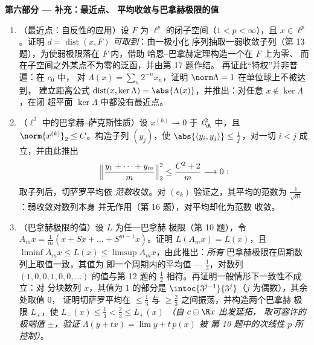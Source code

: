 \begin{problem}[{周末问题 --- $(\ell^p)' = \ell^q$，
自反性，以及 $\ell^\infty$ 的奇异性}]
\medskip
\noindent\textbf{第六部分 --- 补充：最近点、
平均收敛与巴拿赫极限的值}
\begin{enumerate}[resume]
  \item （最近点：自反性的应用）设 $F$ 为
        $\ell^p$ 的闭子空间（$1 < p < \infty$），且
        $x \in \ell^p$。证明 $d = \operatorname{dist}(x,
        F)$ \emph{可取到}：由一极小化
        序列抽取一弱收敛子列（第
        13 题），为使弱极限落在 $F$ 内，借助
        哈恩--巴拿赫定理构造一个在 $F$ 上为零、
        而在子空间之外某点不为零的泛函，并由第 17 题作结。
        再证此“特权”并非普遍：在 $c_0$ 中，
        对 $\Lambda(x) = \sum_n2^{-n}x_n$，证明
        $\norm\Lambda = 1$ 在单位球上不被达到，
        建立距离公式
        $\operatorname{dist}(x, \ker\Lambda) =
        \abs{\Lambda(x)}$，并推出：对任意 $x \notin
        \ker\Lambda$，在闭
        超平面 $\ker\Lambda$ 中都没有最近点。
  \item （$\ell^2$ 中的巴拿赫--萨克斯性质）设 $x^{(k)}
        \rightharpoonup 0$ 于 $\ell^2_{\R}$ 中，且
        $\norm{x^{(k)}}_2 \leq C$。构造子列
        $(y_j)$，使 $\abs{\langle y_i, y_j\rangle} \leq
        \frac1j$，对一切 $i < j$ 成立，并由此推出
        \[
        \Bigl\lVert\frac{y_1 + \dots + y_m}m\Bigr\rVert_2^2
        \leq \frac{C^2 + 2}m \longrightarrow 0 :
        \]
        取子列后，切萨罗平均依
        \emph{范数}收敛。对 $(e_k)$ 验证之，其平均的范数为
        $\frac1{\sqrt m}$：弱收敛对数列本身
        并无作用（第 16 题），对平均却化为范数
        收敛。
  \item （巴拿赫极限的值）设 $L$ 为任一巴拿赫
        极限（第 10 题），令 $A_mx = \frac1m(x + Sx + \dots
        + S^{m-1}x)$。证明 $L(A_mx) = L(x)$，且 $\liminf A_mx
        \leq L(x) \leq \limsup A_mx$，由此推出：\emph{所有}
        巴拿赫极限在周期数列上取值一致，其值为
        即一个周期内的平均值 --- $\frac13$，对数列 $(1, 0, 0, 1,
        0, 0, \dots)$ 的值与第 12 题的
        $\frac12$ 相符。再证明一般情形下一致性不成立：对
        分块数列 $x$，其值为 $1$ 的部分是
        $\intoc{3^{j-1}}{3^j}$（$j$ 为偶数），其余处取值 $0$，
        证明切萨罗平均在 $\leq
        \frac13$ 与 $\geq \frac23$ 之间振荡，并构造两个巴拿赫
        极限 $L_\pm$，使 $L_-(x) \leq \frac13 < \frac23
        \leq L_+(x)$ \emph{（自 $c \oplus \R x$ 出发延拓，
        取可容许的极端值 $\pm$，验证
        $\Lambda(y + tx) = \lim y + t\,p(x)$ 被
        第 10 题中的次线性 $p$ 所控制）}。
\end{enumerate}
\end{problem}
